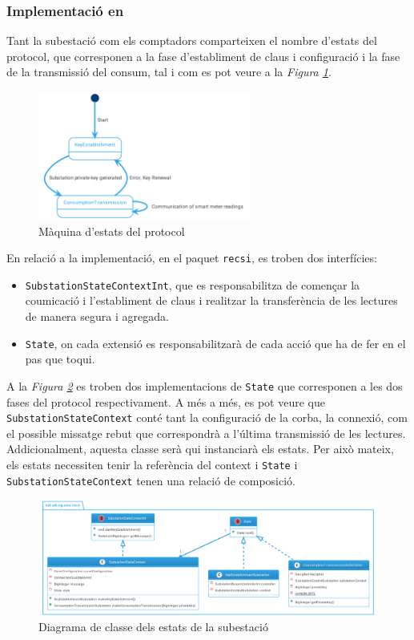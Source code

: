 \subsubsection{Implementació en \cite{recsi}}
Tant la subestació com els comptadors comparteixen el nombre d'estats del protocol, que corresponen a la fase d'establiment de claus i configuració i la fase de la transmissió del consum, tal i com es pot veure a la \textit{Figura \ref{fig:recsi-state}}.
\begin{figure}[H]
	\centering
	\includegraphics[width=7cm]{classes/recsistate.png}
	\caption{Màquina d'estats del protocol \cite{recsi}}
	\label{fig:recsi-state}
\end{figure}
En relació a la implementació, en el paquet \texttt{recsi}, es troben dos interfícies:
\begin{itemize}
	\item \texttt{SubstationStateContextInt}, que es responsabilitza de començar la coumicació i l'establiment de claus i realitzar la transferència de les lectures de manera segura i agregada.
	\item \texttt{State}, on cada extensió es responsabilitzarà de cada acció que ha de fer en el pas que toqui.
\end{itemize}
A la \textit{Figura \ref{fig:recsi}} es troben dos implementacions de \texttt{State} que corresponen a les dos fases del protocol respectivament. A més a més, es pot veure que \texttt{SubstationStateContext} conté tant la configuració de la corba, la connexió, com el possible missatge rebut que correspondrà a l'última transmissió de les lectures. Addicionalment, aquesta classe serà qui instanciarà els estats. Per això mateix, els estats necessiten tenir la referència del context i \texttt{State} i \texttt{SubstationStateContext} tenen una relació de composició. 
\begin{figure}[H]
	\centering
	\includegraphics[width=16cm]{classes/recsi.png}
	\caption{Diagrama de classe dels estats de la subestació}
	\label{fig:recsi}
\end{figure}
